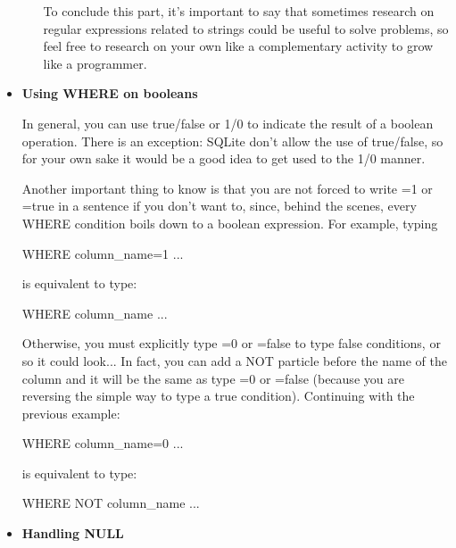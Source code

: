 \documentclass[10pt, oneside]{article}
\begin{document}
\begin{itemize}
\begin{itemize}
		To conclude this part, it's important to say that sometimes research on regular expressions related to strings could be useful to solve problems, so feel free to research on your own like a complementary activity to grow like a programmer.
		
	\end{itemize}

	\item \textbf{Using WHERE on booleans}
	
	In general, you can use true/false or 1/0 to indicate the result of a boolean operation. There is an exception: SQLite don't allow the use of true/false, so for your own sake it would be a good idea to get used to the 1/0 manner.
	
	Another important thing to know is that you are not forced to write =1 or =true in a sentence if you don't want to, since, behind the scenes, every WHERE condition boils down to a boolean expression. For example, typing
	
	\begin{center}
		WHERE column\_name=1 ...
	\end{center}
	is equivalent to type:
	\begin{center}
		WHERE column\_name ...
	\end{center}
	
	Otherwise, you must explicitly type =0 or =false to type false conditions, or so it could look... In fact, you can add a NOT particle before the name of the column and it will be the same as type =0 or =false (because you are reversing the simple way to type a true condition). Continuing with the previous example:
	
	\begin{center}
		WHERE column\_name=0 ...
	\end{center}
	is equivalent to type:
	\begin{center}
		WHERE NOT column\_name ...
	\end{center}
	
	\item \textbf{Handling NULL}

\end{itemize}
\end{document}
